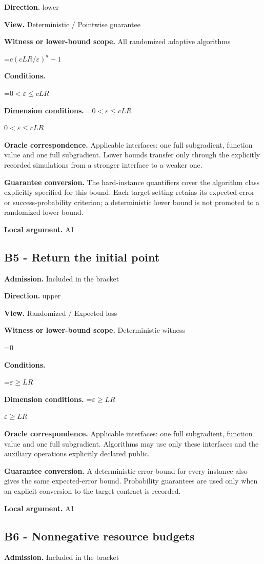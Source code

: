 \documentclass[10pt,a4paper]{article}
\newcommand{\AtlasMath}[1]{\par\begingroup\centering\setbox0=\hbox{$\displaystyle #1$}\ifdim\wd0>1.4\linewidth\typeout{ATLAS WIDE FORMULA: \the\wd0}\fi\ifdim\wd0>\linewidth\resizebox{\linewidth}{!}{\box0}\else\box0\fi\par\endgroup}
\newcommand{\AtlasInlineMath}[1]{\begingroup\setbox0=\hbox{$#1$}\ifdim\wd0>.4\linewidth\endgroup\AtlasMath{#1}\else\endgroup$#1$\fi}
\begin{document}
\textbf{Direction.} lower

\textbf{View.} Deterministic / Pointwise guarantee

\textbf{Witness or lower-bound scope.} All randomized adaptive algorithms

\AtlasMath{c(cLR/\varepsilon)^d-1}
\textbf{Conditions.} 
\AtlasMath{0<\varepsilon\le cLR}


\textbf{Dimension conditions.} \AtlasInlineMath{0<\varepsilon\le cLR}

\textbf{Oracle correspondence.} Applicable interfaces: one full subgradient, function value and one full subgradient. Lower bounds transfer only through the explicitly recorded simulations from a stronger interface to a weaker one.

\textbf{Guarantee conversion.} The hard-instance quantifiers cover the algorithm class explicitly specified for this bound. Each target setting retains its expected-error or success-probability criterion; a deterministic lower bound is not promoted to a randomized lower bound.

\textbf{Local argument.} A1

\subsection{B5 - Return the initial point}
\textbf{Admission.} Included in the bracket

\textbf{Direction.} upper

\textbf{View.} Randomized / Expected loss

\textbf{Witness or lower-bound scope.} Deterministic witness

\AtlasMath{0}
\textbf{Conditions.} 
\AtlasMath{\varepsilon\ge LR}


\textbf{Dimension conditions.} \AtlasInlineMath{\varepsilon\ge LR}

\textbf{Oracle correspondence.} Applicable interfaces: one full subgradient, function value and one full subgradient. Algorithms may use only these interfaces and the auxiliary operations explicitly declared public.

\textbf{Guarantee conversion.} A deterministic error bound for every instance also gives the same expected-error bound. Probability guarantees are used only when an explicit conversion to the target contract is recorded.

\textbf{Local argument.} A1

\subsection{B6 - Nonnegative resource budgets}
\textbf{Admission.} Included in the bracket
\end{document}
